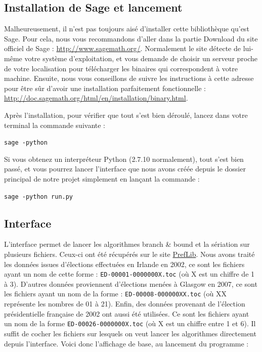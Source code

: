\documentclass[11pt, a4paper]{article}
\begin{document}
\subsection{Installation de Sage et lancement}
Malheureusement, il n'est pas toujours aisé d'installer cette bibliothèque qu'est Sage. Pour cela, nous vous recommandons d'aller dans la partie \og Download \fg{} du site officiel de Sage : \href{http://www.sagemath.org/}{http://www.sagemath.org/}. Normalement le site détecte de lui-même votre système d'exploitation, et vous demande de choisir un serveur proche de votre localisation pour télécharger les binaires qui correspondent à votre machine. Ensuite, nous vous conseillons de suivre les instructions à cette adresse pour être sûr d'avoir une installation parfaitement fonctionnelle : \href{http://doc.sagemath.org/html/en/installation/binary.html}{http://doc.sagemath.org/html/en/installation/binary.html}.

Après l'installation, pour vérifier que tout s'est bien déroulé, lancez dans votre terminal la commande suivante :
\begin{center}
\texttt{sage -python}
\end{center}
Si vous obtenez un interpréteur Python (2.7.10 normalement), tout s'est bien passé, et vous pourrez lancer l'interface que nous avons créée depuis le dossier principal de notre projet simplement en lançant la commande :
\begin{center}
\texttt{sage -python run.py}
\end{center}

\subsection{Interface}

L'interface permet de lancer les algorithmes branch \& bound et la sériation sur plusieurs fichiers. Ceux-ci ont été récupérés sur le site \href{http://www.preflib.org/}{PrefLib}. Nous avons traité les données issues d'élections effectuées en Irlande en 2002, ce sont les fichiers ayant un nom de cette forme : \texttt{ED-00001-0000000X.toc} (où X est un chiffre de 1 à 3). D'autres données proviennent d'élections menées à Glasgow en 2007, ce sont les fichiers ayant un nom de la forme : \texttt{ED-00008-000000XX.toc} (où XX représente les nombres de 01 à 21). Enfin, des données provenant de l'élection présidentielle française de 2002 ont aussi été utilisées. Ce sont les fichiers ayant un nom de la forme \texttt{ED-00026-0000000X.toc} (où X est un chiffre entre 1 et 6). Il suffit de cocher les fichiers sur lesquels on veut lancer les algorithmes directement depuis l'interface. Voici donc l'affichage de base, au lancement du programme :
\end{document}
